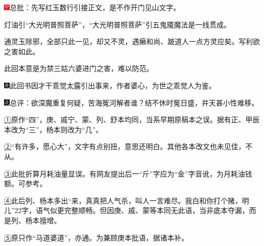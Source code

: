 \includegraphics[width=3mm]{../Images/00002}{总批：先写红玉数行引接正文，是不作开门见山文字。}

{灯油引``大光明普照菩萨''，``大光明普照菩萨''引五鬼魇魔法是一线贯成。}

{通灵玉除邪，全部只此一见，却又不灵，遇癞和尚、跛道人一点方灵应矣。写利欲之害如此。}

{此回本意是为禁三姑六婆进门之害，难以防范。}

{{\includegraphics[width=3mm]{../Images/00004}此回书因才干乖觉太露引出事来，作者婆心，为世之乖觉人为鉴。}}

{\includegraphics[width=3mm]{../Images/00005}总评：欲深魔重复何疑，苦海冤河解者谁？结不休时冤日盛，井天甚小性难移。}

{}

{\href{../Text/part0029_split_000.html\#navto_1_a}{①}原作``四''，庚、戚宁、蒙、列、舒本均同，当系早期原稿本之误。据有正、甲辰本改为``三''，杨本则改为``几''。}

{\href{../Text/part0029_split_000.html\#navto_2_a}{②}``有许多，愿心大''，文字有点别扭，意思还明白。其他各本改文也未见佳，不从。}

{\href{../Text/part0029_split_000.html\#navto_3_a}{③}此批折算月耗油量显误。有网友提出后一``斤''字应为``金''字音讹，为月耗油钱额。可参考。}

{\href{../Text/part0029_split_000.html\#navto_4_a}{④}此后列、杨本多出``来，真真把人气杀，叫人一言难尽。我白和你打个赌，明儿''22字，语气似更完整顺畅。但因庚、戚、蒙等本同无此语，当非底本夺漏，而是列、杨本擅增。}

{\href{../Text/part0029_split_000.html\#navto_5_a}{⑤}原只作``马道婆道''，亦通。为兼顾庚本批语，据诸本补。}
